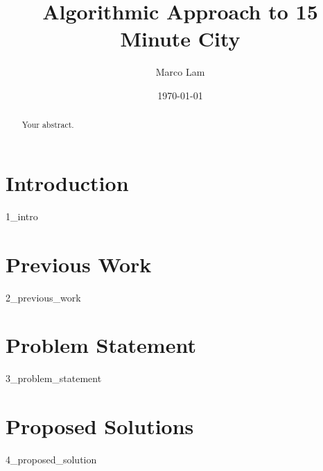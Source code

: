 \documentclass{article}
\title{Algorithmic Approach to 15 Minute City}
\author{Marco Lam}
\date{\today}
\begin{document}
\maketitle

\begin{abstract}
    Your abstract.
\end{abstract}

\newpage

\tableofcontents
\listoffigures
\listoftables

\newpage

\section{Introduction}

{1_intro}

\section{Previous Work}

{2_previous_work}

\newpage

\section{Problem Statement}

{3_problem_statement}

\newpage

\section{Proposed Solutions}

{4_proposed_solution}

\newpage


\end{document}
